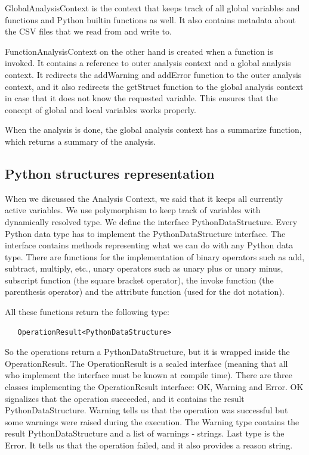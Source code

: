 GlobalAnalysisContext is the context that keeps track of all global variables and functions and Python builtin functions
as well.
It also contains metadata about the CSV files that we read from and write to.

FunctionAnalysisContext on the other hand is created when a function is invoked.
It contains a reference to outer analysis context and a global analysis context.
It redirects the addWarning and addError function to the outer analysis context, and it also redirects the getStruct
function to the global analysis context in case that it does not know the requested variable.
This ensures that the concept of global and local variables works properly.

When the analysis is done, the global analysis context has a summarize function, which returns a summary of the analysis.

\subsection{Python structures representation}\label{subsec:python-structures-representation}

When we discussed the Analysis Context, we said that it keeps all currently active variables.
We use polymorphism to keep track of variables with dynamically resolved type.
We define the interface PythonDataStructure.
Every Python data type has to implement the PythonDataStructure interface.
The interface contains methods representing what we can do with any Python data type.
There are functions for the implementation of binary operators such as add, subtract, multiply, etc., unary operators
such as unary plus or unary minus, subscript function (the square bracket operator), the invoke function
(the parenthesis operator) and the attribute function (used for the dot notation).

All these functions return the following type:
\begin{verbatim}
   OperationResult<PythonDataStructure>
\end{verbatim}
So the operations return a PythonDataStructure, but it is wrapped inside the OperationResult.
The OperationResult is a sealed interface (meaning that all who implement the interface must be known at compile time).
There are three classes implementing the OperationResult interface: OK, Warning and Error.
OK signalizes that the operation succeeded, and it contains the result PythonDataStructure.
Warning tells us that the operation was successful but some warnings were raised during the execution.
The Warning type contains the result PythonDataStructure and a list of warnings - strings.
Last type is the Error.
It tells us that the operation failed, and it also provides a reason string.


